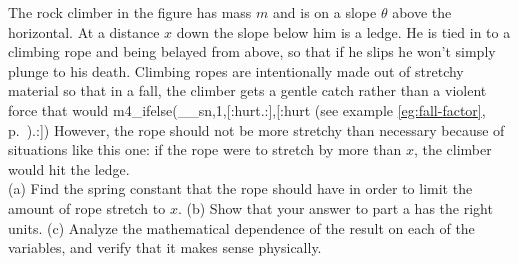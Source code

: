 The rock climber in the figure has mass $m$ and is on a slope $\theta$ above the
horizontal. At a distance $x$ down the slope below him is a ledge. He is tied in
to a climbing rope and being belayed from above, so that if he slips he won't
simply plunge to his death. Climbing ropes are intentionally made out of stretchy
material so that in a fall, the climber gets a gentle catch rather than a violent
force that would
m4_ifelse(__sn,1,[:hurt.:],[:hurt (see example \ref{eg:fall-factor}, p.~\pageref{eg:fall-factor}).:])
However, the rope
should not be more stretchy than necessary because of situations like this one:
if the rope were to stretch by more than $x$, the climber would hit the ledge.\\
(a) Find the spring constant that the rope should have in order to limit the
amount of rope stretch to $x$.\answercheck\hwendpart
(b) Show that your answer to part a has the right units.\hwendpart
(c) Analyze the mathematical dependence of the result on each of the variables, and verify that
it makes sense physically.\hwendpart

